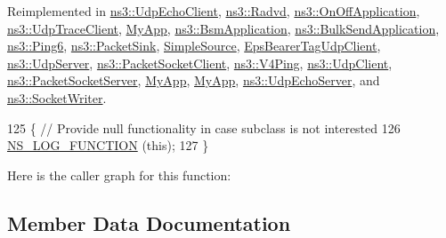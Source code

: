 Reimplemented in \hyperlink{classns3_1_1UdpEchoClient_ae7aba9059fa05430d62583804f1504c6}{ns3\+::\+Udp\+Echo\+Client}, \hyperlink{classns3_1_1Radvd_a8aaf0b7f7329e72a67f1293b01e60341}{ns3\+::\+Radvd}, \hyperlink{classns3_1_1OnOffApplication_a944980f8e00a8dcfb14fd4d915396ef7}{ns3\+::\+On\+Off\+Application}, \hyperlink{structns3_1_1UdpTraceClient_a29693203c27eb211932a0955934bfe7f}{ns3\+::\+Udp\+Trace\+Client}, \hyperlink{classMyApp_a69051ff18125cf53b8f83df56caa16f7}{My\+App}, \hyperlink{classns3_1_1BsmApplication_a704b500c0ca87cc950a90e1544e9bbcd}{ns3\+::\+Bsm\+Application}, \hyperlink{classns3_1_1BulkSendApplication_aa7df541c84adbab61066bd9f6ea27acf}{ns3\+::\+Bulk\+Send\+Application}, \hyperlink{classns3_1_1Ping6_a825748c9021a08f526de4373a920861d}{ns3\+::\+Ping6}, \hyperlink{classns3_1_1PacketSink_a622558c6115057d0d425657242843dd2}{ns3\+::\+Packet\+Sink}, \hyperlink{classSimpleSource_aa336bf31214e9048bf3248e5dfef5e4f}{Simple\+Source}, \hyperlink{classEpsBearerTagUdpClient_a541823d402380299cb112b39c11547b6}{Eps\+Bearer\+Tag\+Udp\+Client}, \hyperlink{classns3_1_1UdpServer_adb29aa59623e5baa7f42642c3f811a72}{ns3\+::\+Udp\+Server}, \hyperlink{classns3_1_1PacketSocketClient_ac5a664a8c6265dafd8e45b5897d27545}{ns3\+::\+Packet\+Socket\+Client}, \hyperlink{classns3_1_1V4Ping_afbf27c64128d147b0d51dfa09ce7b1c8}{ns3\+::\+V4\+Ping}, \hyperlink{classns3_1_1UdpClient_affb385b7a19c3dc83359787d55226712}{ns3\+::\+Udp\+Client}, \hyperlink{classns3_1_1PacketSocketServer_a54fddf2f15957f64f061bd42bd44a052}{ns3\+::\+Packet\+Socket\+Server}, \hyperlink{classMyApp_a5fe8371947ecfada9e289077d2ca6645}{My\+App}, \hyperlink{classMyApp_a5fe8371947ecfada9e289077d2ca6645}{My\+App}, \hyperlink{classns3_1_1UdpEchoServer_a5bc11ac1041c31c396cad3db5f42fb53}{ns3\+::\+Udp\+Echo\+Server}, and \hyperlink{classns3_1_1SocketWriter_a24494a9fb10911a35fbbd4f3bf550af9}{ns3\+::\+Socket\+Writer}.


\begin{DoxyCode}
125 \{ \textcolor{comment}{// Provide null functionality in case subclass is not interested}
126   \hyperlink{log-macros-disabled_8h_a90b90d5bad1f39cb1b64923ea94c0761}{NS\_LOG\_FUNCTION} (\textcolor{keyword}{this});
127 \}
\end{DoxyCode}


Here is the caller graph for this function\+:




\subsection{Member Data Documentation}

